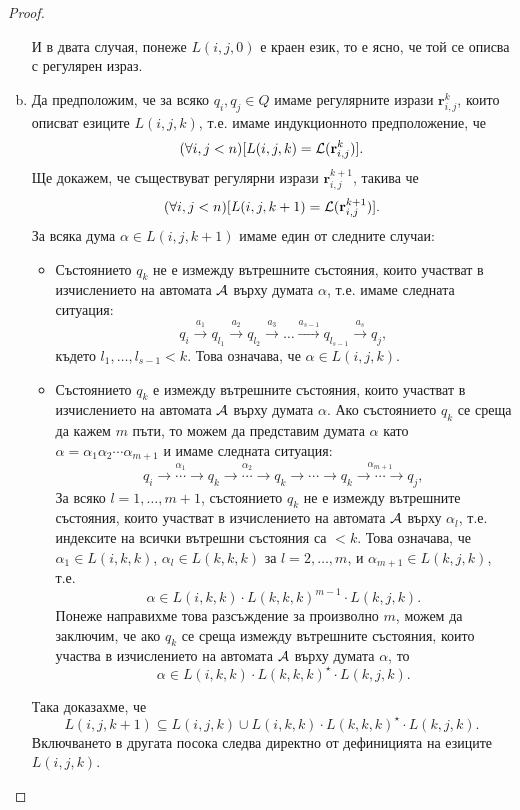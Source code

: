 \begin{proof}
\begin{enumerate}[a)]
    И в двата случая, понеже $L(i,j,0)$ е краен език, то е ясно, че той се описва с регулярен израз.
  \item
    Да предположим, че за всяко $q_i,q_j\in Q$ имаме регулярните изрази $\mathbf{r}^{k}_{i,j}$, които
    описват езиците $L(i,j,k)$, т.е. имаме индукционното предположение, че
    \[(\forall i,j < n)[L(i,j,k) = \mathcal{L}(\mathbf{r}^{k}_{i,j})].\] 
    Ще докажем, че съществуват регулярни изрази $\mathbf{r}^{k+1}_{i,j}$, такива че
    \[(\forall i,j < n)[L(i,j,k+1) = \mathcal{L}(\mathbf{r}^{k+1}_{i,j})].\] 
    За всяка дума $\alpha \in L(i,j,k+1)$ имаме един от следните случаи:
    \begin{itemize}
    \item
      Състоянието $q_k$ не е измежду вътрешните състояния, които участват в изчислението на автомата $\mathcal{A}$ върху думата $\alpha$, т.е. имаме следната ситуация:
      \[q_i\stackrel{a_1}{\rightarrow} q_{l_1} \stackrel{a_2}{\rightarrow} q_{l_2} \stackrel{a_3}{\rightarrow} \dots \stackrel{a_{s-1}}{\rightarrow} q_{l_{s-1}}\stackrel{a_s}{\rightarrow} q_j,\]
      където $l_1,\dots,l_{s-1} < k$.
      Това означава, че $\alpha \in L(i,j,k)$.
    \item
      Състоянието $q_k$ е измежду вътрешните състояния, които участват в изчислението на автомата $\mathcal{A}$ върху думата $\alpha$.
      Ако състоянието $q_k$ се среща да кажем $m$ пъти, то можем да представим думата $\alpha$ като $\alpha = \alpha_1\alpha_2\cdots\alpha_{m+1}$ и имаме следната ситуация:
      \[q_i\stackrel{\alpha_1}{\rightarrow\cdots\rightarrow} q_{k} \stackrel{\alpha_2}{\rightarrow\cdots\rightarrow} q_k \rightarrow\cdots\rightarrow q_{k} \stackrel{\alpha_{m+1}}{\rightarrow\cdots\rightarrow} q_j,\]
      За всяко $l=1,\dots,m+1$, състоянието $q_k$ не е измежду вътрешните състояния, които участват в изчислението на автомата $\mathcal{A}$ върху $\alpha_l$, т.е. индексите на всички вътрешни състояния са $<k$.
      Това означава, че $\alpha_1 \in L(i,k,k)$, $\alpha_l \in L(k,k,k)$ за $l=2,\dots,m$, и $\alpha_{m+1} \in L(k,j,k)$, т.е.
      \[\alpha \in L(i,k,k) \cdot L(k,k,k)^{m-1} \cdot L(k,j,k).\]
      Понеже направихме това разсъждение за произволно $m$,
      можем да заключим, че ако $q_k$ се среща измежду вътрешните състояния, които участва в изчислението на автомата $\mathcal{A}$ върху думата $\alpha$,
      то \[\alpha \in L(i,k,k) \cdot L(k,k,k)^\star \cdot L(k,j,k).\]
    \end{itemize}
    Така доказахме, че 
    \[L(i,j,k+1) \subseteq L(i,j,k) \cup L(i,k,k) \cdot L(k,k,k)^\star \cdot L(k,j,k).\]
    Включването в другата посока следва директно от дефиницията на езиците $L(i,j,k)$.
    

\end{enumerate}
\end{proof}
